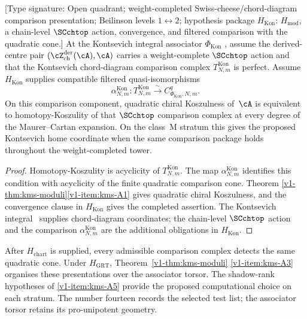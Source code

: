 \begin{proposition}
\label{v1-prop:kms-kontsevich-chart}
\ClaimStatusConditional
\textup{[Type signature: Open quadrant; weight-completed
Swiss-cheese/chord-diagram comparison presentation; Beilinson levels
$1\leftrightarrow2$; hypothesis package $H_{\mathrm{Kon}}$:
$H_{\mathrm{mod}}$, a chain-level $\SCchtop$ action, convergence,
and filtered comparison with the quadratic cone.]}
At the Kontsevich integral associator $\Phi_{\mathrm{Kon}}$
\cite{Kontsevich93}, assume the derived-centre pair
$(\cZ^{\mathrm{der}}_{\mathrm{ch}}(\cA),\cA)$ carries a
weight-complete $\SCchtop$ action and that the Kontsevich
chord-diagram comparison complex $T^{\mathrm{Kon}}_{N,m}$ is perfect.
Assume $H_{\mathrm{Kon}}$ supplies compatible filtered
quasi-isomorphisms
\[
 \alpha^{\mathrm{Kon}}_{N,m}\colon
 T^{\mathrm{Kon}}_{N,m}\xrightarrow{\sim}
 C^q_{\Phi_{\mathrm{Kon}},N,m}.
\]
On this comparison component, quadratic chiral Koszulness of~$\cA$
is equivalent
to homotopy-Koszulity of that $\SCchtop$ comparison complex at
every degree of the Maurer--Cartan expansion. On the
class~$\mathrm{M}$ stratum this gives the proposed Kontsevich home
coordinate when the same comparison package holds throughout the
weight-completed tower.
\end{proposition}

\begin{proof}
Homotopy-Koszulity is acyclicity of
$T^{\mathrm{Kon}}_{N,m}$.  The map
$\alpha^{\mathrm{Kon}}_{N,m}$ identifies this condition with
acyclicity of the finite quadratic comparison cone.  Theorem
\ref{v1-thm:kms-moduli}\ref{v1-item:kms-A1} gives quadratic
chiral Koszulness, and the convergence clause in
$H_{\mathrm{Kon}}$ gives the completed assertion.  The Kontsevich
integral~\cite{Kontsevich93} supplies chord-diagram coordinates; the
chain-level $\SCchtop$ action and the comparison
$\alpha^{\mathrm{Kon}}_{N,m}$ are the additional obligations in
$H_{\mathrm{Kon}}$.
\end{proof}

\begin{remark}
\label{v1-rem:kms-chart-redundancy}
After $H_{\mathrm{chart}}$ is supplied, every admissible comparison
complex detects the same quadratic cone.  Under
$H_{\mathrm{GRT}}$, Theorem~\ref{v1-thm:kms-moduli}
\ref{v1-item:kms-A3} organises these presentations over the
associator torsor.  The shadow-rank hypotheses of
\ref{v1-item:kms-A5} provide the proposed computational choice on
each stratum.  The number fourteen records the selected test list;
the associator torsor retains its pro-unipotent geometry.
\end{remark}

